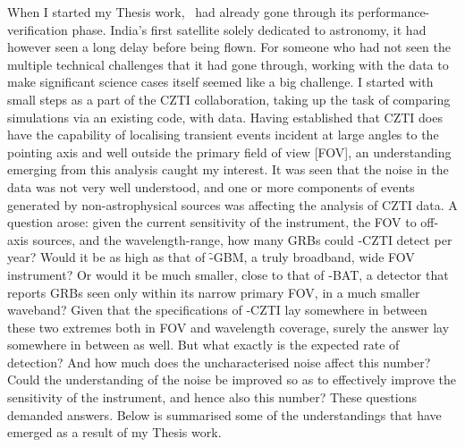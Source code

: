 When I started my Thesis work, \AS\ had already gone through its performance-verification phase. India's first satellite solely dedicated to astronomy, it had however seen a long delay before being flown. For someone who had not seen the multiple technical challenges that it had gone through, working with the data to make significant science cases itself seemed like a big challenge. I started with small steps as a part of the CZTI collaboration, taking up the task of comparing simulations via an existing code, with data. Having established that CZTI does have the capability of localising transient events incident at large angles to the pointing axis and well outside the primary field of view [FOV], an understanding emerging from this analysis caught my interest. It was seen that the noise in the data was not very well understood, and one or more components of events generated by non-astrophysical sources was affecting the analysis of CZTI data. A question arose: given the current sensitivity of the instrument, the FOV to off-axis sources, and the wavelength-range, how many GRBs could \AS -CZTI detect per year? Would it be as high as that of \f -GBM, a truly broadband, wide FOV instrument? Or would it be much smaller, close to that of \s -BAT, a detector that reports GRBs seen only within its narrow primary FOV, in a much smaller waveband? Given that the specifications of \AS -CZTI lay somewhere in between these two extremes both in FOV and wavelength coverage, surely the answer lay somewhere in between as well. But what exactly is the expected rate of detection? And how much does the uncharacterised noise affect this number? Could the understanding of the noise be improved so as to effectively improve the sensitivity of the instrument, and hence also this number? These questions demanded answers. Below is summarised some of the understandings that have emerged as a result of my Thesis work.


